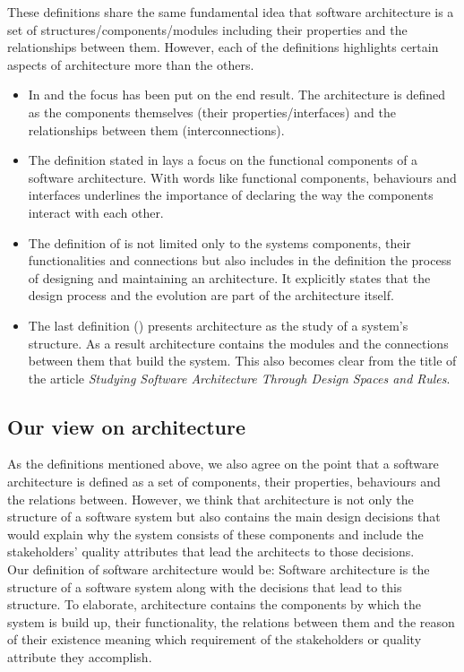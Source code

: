\documentclass{article}
\begin{document}
These definitions share the same fundamental idea that software architecture
is a set of structures/components/modules including their properties and the
relationships between them. However, each of the definitions highlights certain
aspects of architecture more than the others. 
\begin{itemize}
\item In \cite{clemens} and \cite{hayesroth} the focus has been put on the end result. The architecture 
is defined as the components themselves (their properties/interfaces) and the relationships between them (interconnections).
\item The definition stated in \cite{hayesroth} lays a focus on the functional components of a software architecture. With words like functional components, 
behaviours and interfaces underlines the importance of declaring the way the components interact with each other.
\item The definition of \cite{IEEE1471} is not limited only to the systems components, their functionalities and connections but also includes in the definition the 
process of designing and maintaining an architecture. It explicitly states that the design process and the evolution are part of the architecture itself.
\item The last definition (\cite{lane90}) presents architecture as the study of a system's structure. As a result architecture contains the modules and the connections between them that build the system. This also becomes clear
from the title of the article \emph{Studying Software Architecture Through Design Spaces and Rules}.

\end{itemize}

\subsection{Our view on architecture}
As the definitions mentioned above, we also agree on the point that a software architecture is defined as a set of components, their properties, behaviours and the relations
between. However, we think that architecture is not only the structure of a software system but also contains the main design decisions that would explain why the system consists of 
these components and include the stakeholders' quality attributes that lead the architects to those decisions. \\ 

Our definition of software architecture would be:
Software architecture is the structure of a software system along with the decisions that lead to this structure. To elaborate, architecture contains the components by which
the system is build up, their functionality, the relations between them and the reason of their existence meaning which requirement of the stakeholders or quality attribute they accomplish. 

\end{document}

